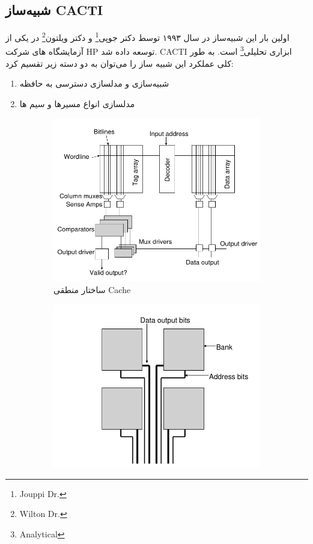 \documentclass[12pt]{exam}
\begin{document}
\begin{questions}
\section{شبیه‌ساز CACTI}
اولین بار این شبیه‌ساز در سال ۱۹۹۳ توسط دکتر جوپی\footnote{Jouppi Dr.} و دکتر ویلتون\footnote{Wilton Dr.} در یکی از آزمایشگاه های شرکت HP توسعه داده شد. CACTI ابزاری تحلیلی\footnote{Analytical} است. به طور کلی عملکرد این شبیه ساز را می‌توان به دو دسته زیر تقسیم کرد:

\begin{enumerate}
	\item شبیه‌سازی و مدلسازی دسترسی به حافظه
	\item مدلسازی انواع مسیر‌ها و سیم ها
\end{enumerate}



\begin{figure}
	\centering
	\begin{subfigure}[b]{0.3\textwidth}
		\centering
		\includegraphics[width=\textwidth]{images/img1}
		\caption{ساختار منطقی Cache}
		\label{ساختار منطقی Cache}
	\end{subfigure}
	\hfill
	\begin{subfigure}[b]{0.3\textwidth}
		\centering
		\includegraphics[width=\textwidth]{images/img2}

\end{subfigure}
\end{figure}
\end{questions}
\end{document}
